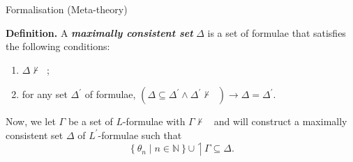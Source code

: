 \documentclass[serif,table,10pt]{beamer}
\newcommand{\IN}{\mathbb{N}}
\newcommand{\0}{\texttt{0}}
\newcommand{\1}{\texttt{1}}
\newcommand{\embed}[1]{{\upharpoonleft} {#1}}
\newcommand{\inlinedef}[1]{\emph{\textbf{#1}}}
\newcommand{\Lbot}{\mathop{\dot{\bot}}}
\begin{document}
\begin{frame}{Formalisation (Meta-theory)}

    \textbf{Definition.}
    A \inlinedef{maximally consistent set} $\Delta$ is a set of formulae that satisfies the following conditions:
    \begin{enumerate}
        \item $\Delta \nvdash \Lbot$;
        \item for any set $\Delta^\prime$ of formulae, $ ( \Delta \subseteq \Delta^\prime \land \Delta^\prime \nvdash \Lbot ) \to \Delta = \Delta^\prime $.
    \end{enumerate}

    Now, we let $\Gamma$ be a set of $L$-formulae with $\Gamma \nvdash \Lbot$ and will construct a maximally consistent set $\Delta$ of $L^\prime$-formulae such that $$\left\{ \theta_n \mid n \in \IN \right\} \cup \embed{\Gamma} \subseteq \Delta .$$

\end{frame}
\end{document}
